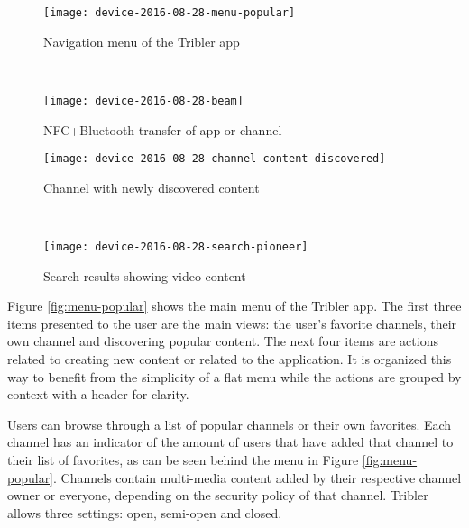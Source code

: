 \begin{figure}[p]
	\centering
	\begin{minipage}{.4\textwidth}
		\texttt{[image: device-2016-08-28-menu-popular]}
		\caption{Navigation menu of the Tribler app}
		\label{fig:menu-popular}
	\end{minipage}
	~
	\begin{minipage}{.4\textwidth}
		\texttt{[image: device-2016-08-28-beam]}
		\caption{NFC+Bluetooth transfer of app or channel}
		\label{fig:beam}
	\end{minipage}
	
	\begin{minipage}{.4\textwidth}
		\texttt{[image: device-2016-08-28-channel-content-discovered]}
		\caption{Channel with newly discovered content}
		\label{fig:channel-content-discovered}
	\end{minipage}
	~
	\begin{minipage}{.4\textwidth}
		\texttt{[image: device-2016-08-28-search-pioneer]}
		\caption{Search results showing video content}
		\label{fig:search-pioneer}
	\end{minipage}
\end{figure}


Figure \ref{fig:menu-popular} shows the main menu of the Tribler app.
The first three items presented to the user are the main views: the user's favorite channels, their own channel and discovering popular content.
The next four items are actions related to creating new content or related to the application.
It is organized this way to benefit from the simplicity of a flat menu while the actions are grouped by context with a header for clarity.

Users can browse through a list of popular channels or their own favorites.
Each channel has an indicator of the amount of users that have added that channel to their list of favorites, as can be seen behind the menu in Figure \ref{fig:menu-popular}.
Channels contain multi-media content added by their respective channel owner or everyone, depending on the security policy of that channel.
Tribler allows three settings: open, semi-open and closed.


